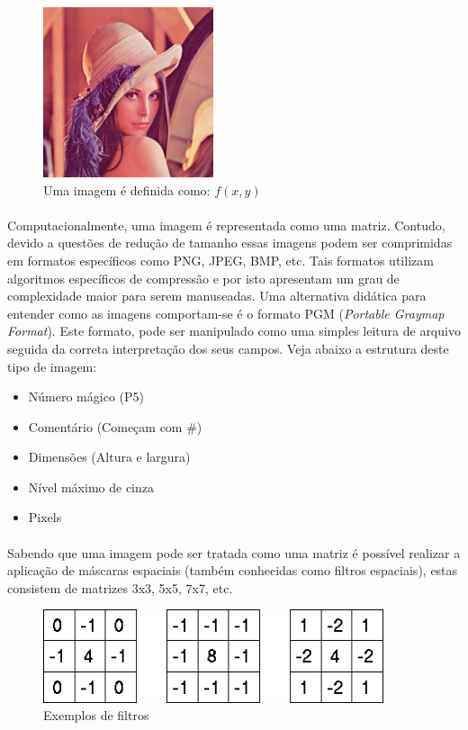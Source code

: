 \documentclass[a4paper,10pt]{article}
\begin{document}
\begin{figure}[ht]
 \center
 \includegraphics[width=5cm]{imagem/Lenna.png}
 \caption {Uma imagem é definida como: $f(x,y)$}
\end{figure}

\paragraph{}
Computacionalmente, uma imagem é representada como uma matriz. Contudo, devido
a questões de redução de tamanho essas imagens podem ser comprimidas em
formatos específicos como PNG, JPEG, BMP, etc. Tais formatos utilizam
algoritmos específicos de compressão e por isto apresentam um grau de
complexidade maior para serem manuseadas. Uma alternativa didática para
entender como as imagens comportam-se é o formato PGM (\textit{Portable
Graymap Format}). Este formato, pode ser manipulado como uma simples leitura
de arquivo seguida da correta interpretação dos seus campos. Veja abaixo a
estrutura deste tipo de imagem:

\begin{itemize}
  \item Número mágico (P5)
  \item Comentário (Começam com \#)
  \item Dimensões (Altura e largura)
  \item Nível máximo de cinza
  \item Pixels
\end{itemize}

\paragraph{}
Sabendo que uma imagem pode ser tratada como uma matriz é possível realizar a 
aplicação de máscaras espaciais (também conhecidas como filtros espaciais),
estas consistem de matrizes 3x3, 5x5, 7x7, etc. 

\begin{figure}[ht]
 \center
 \includegraphics[width=10cm]{imagem/lapmasks2.png}
 \caption {Exemplos de filtros}
\end{figure}
\end{document}
